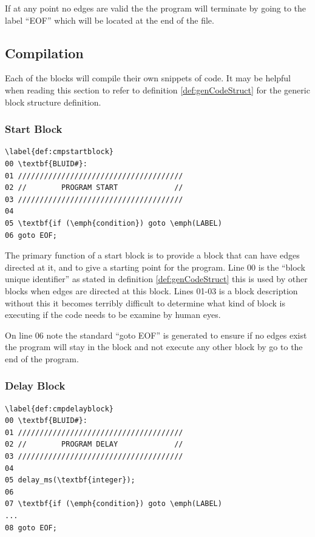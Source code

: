 If at any point no edges are valid the the program will terminate by going to the label ``EOF'' which will be located at the end of the file.


\subsection{Compilation}
Each of the blocks will compile their own snippets of code. It may be helpful when reading this section to refer to definition \ref{def:genCodeStruct} for the generic block structure definition.

\subsubsection{Start Block}
\begin{lstlisting}
\label{def:cmpstartblock}
00 \textbf{BLUID#}:
01 //////////////////////////////////////
02 //        PROGRAM START             //
03 //////////////////////////////////////
04 
05 \textbf{if (\emph{condition}) goto \emph(LABEL)
06 goto EOF;
\end{lstlisting}

The primary function of a start block is to provide a block that can have edges directed at it, and to give a starting point for the program. Line 00 is the ``block unique identifier'' as stated in definition \ref{def:genCodeStruct} this is used by other blocks when edges are directed at this block. Lines 01-03 is a block description without this it becomes terribly difficult to determine what kind of block is executing if the code needs to be examine by human eyes. 

On line 06 note the standard ``goto EOF'' is generated to ensure if no edges exist the program will stay in the block and not execute any other block by go to the end of the program.

\subsubsection{Delay Block}
\begin{lstlisting}
\label{def:cmpdelayblock}
00 \textbf{BLUID#}:
01 //////////////////////////////////////
02 //        PROGRAM DELAY             //
03 //////////////////////////////////////
04
05 delay_ms(\textbf{integer});
06 
07 \textbf{if (\emph{condition}) goto \emph(LABEL)
...
08 goto EOF;
\end{lstlisting}

